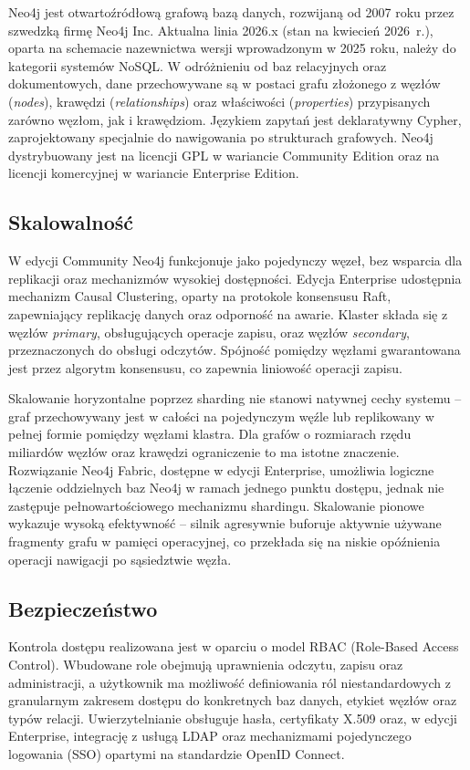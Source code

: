 Neo4j jest otwartoźródłową grafową bazą danych, rozwijaną od 2007 roku przez
szwedzką firmę Neo4j Inc. Aktualna linia 2026.x (stan na kwiecień 2026~r.),
oparta na schemacie nazewnictwa wersji wprowadzonym w 2025 roku, należy do
kategorii systemów NoSQL. W odróżnieniu od baz relacyjnych oraz dokumentowych,
dane przechowywane są w postaci grafu złożonego z węzłów (\textit{nodes}),
krawędzi (\textit{relationships}) oraz właściwości (\textit{properties})
przypisanych zarówno węzłom, jak i krawędziom. Językiem zapytań jest deklaratywny
Cypher, zaprojektowany specjalnie do nawigowania po strukturach grafowych.
Neo4j dystrybuowany jest na licencji GPL w wariancie Community Edition oraz
na licencji komercyjnej w wariancie Enterprise Edition.

\subsection{Skalowalność}

W edycji Community Neo4j funkcjonuje jako pojedynczy węzeł, bez wsparcia dla
replikacji oraz mechanizmów wysokiej dostępności. Edycja Enterprise udostępnia
mechanizm Causal Clustering, oparty na protokole konsensusu Raft, zapewniający
replikację danych oraz odporność na awarie. Klaster składa się z węzłów
\textit{primary}, obsługujących operacje zapisu, oraz węzłów \textit{secondary},
przeznaczonych do obsługi odczytów. Spójność pomiędzy węzłami gwarantowana
jest przez algorytm konsensusu, co zapewnia liniowość operacji zapisu.

Skalowanie horyzontalne poprzez sharding nie stanowi natywnej cechy systemu --
graf przechowywany jest w całości na pojedynczym węźle lub replikowany
w pełnej formie pomiędzy węzłami klastra. Dla grafów o rozmiarach rzędu
miliardów węzłów oraz krawędzi ograniczenie to ma istotne znaczenie. Rozwiązanie
Neo4j Fabric, dostępne w edycji Enterprise, umożliwia logiczne łączenie
oddzielnych baz Neo4j w ramach jednego punktu dostępu, jednak nie zastępuje
pełnowartościowego mechanizmu shardingu. Skalowanie pionowe wykazuje wysoką
efektywność -- silnik agresywnie buforuje aktywnie używane fragmenty grafu
w pamięci operacyjnej, co przekłada się na niskie opóźnienia operacji
nawigacji po sąsiedztwie węzła.

\subsection{Bezpieczeństwo}

Kontrola dostępu realizowana jest w oparciu o model RBAC (Role-Based Access
Control). Wbudowane role obejmują uprawnienia odczytu, zapisu oraz administracji,
a użytkownik ma możliwość definiowania ról niestandardowych z granularnym
zakresem dostępu do konkretnych baz danych, etykiet węzłów oraz typów
relacji. Uwierzytelnianie obsługuje hasła, certyfikaty X.509 oraz, w edycji
Enterprise, integrację z usługą LDAP oraz mechanizmami pojedynczego logowania
(SSO) opartymi na standardzie OpenID Connect.

